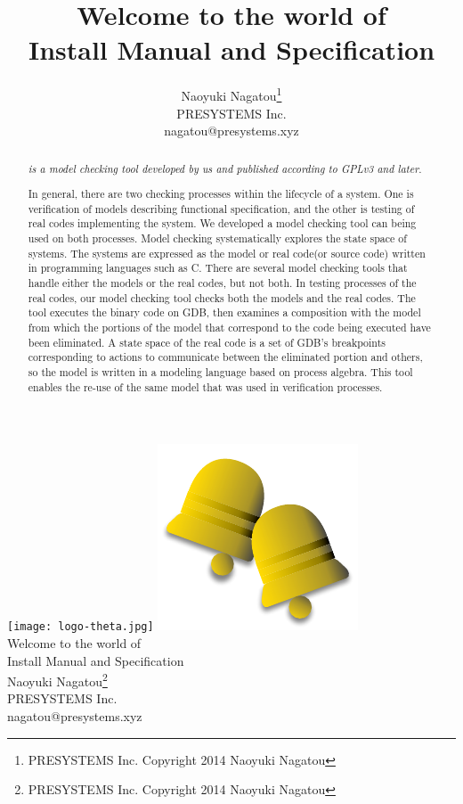 \documentclass[12pt,a4paper,titlepage]{article}
\title{Welcome to the world of \NHK\\
{\small\textemdash Install Manual and Specification\textemdash}}
\author{Naoyuki Nagatou\thanks{PRESYSTEMS Inc. Copyright 2014 Naoyuki Nagatou}\\%
\small PRESYSTEMS Inc.\\[6pt]
\small nagatou@presystems.xyz}
\date{}
\theoremstyle{break}
\begin{document}
  \begin{titlepage}
\vspace*{3cm}
\begin{center}
\texttt{[image: logo-theta.jpg]}
\includegraphics[scale=0.4]{bell.pdf}\\[5cm]
{\LARGE Welcome to the world of \NHK\\
{\small\textemdash Install Manual and Specification\textemdash}}\\[1cm]
{\large Naoyuki Nagatou\thanks{PRESYSTEMS Inc. Copyright 2014 Naoyuki Nagatou}\\%
\small PRESYSTEMS Inc.\\[6pt]
\small nagatou@presystems.xyz}
\end{center}
%
%
\begin{abstract}
\NHK \emph{is a model checking tool developed by us and published according to GPLv3 and later}.

In general, there are two checking processes within the lifecycle of a system.
One is verification of models describing functional specification, 
and the other is testing of real codes implementing the system.
We developed a model checking tool can being used on both processes.
Model checking systematically explores the state space of systems.
The systems are expressed as the model
or real code(or source code) written in programming languages such as C.
There are several model checking tools 
that handle either the models or the real codes,
but not both.
In testing processes of the real codes,
our model checking tool checks both the models and the real codes.
The tool executes the binary code on GDB,
then examines a composition with the model from which the portions of 
the model that correspond to the code being executed
have been eliminated.
A state space of the real code is a set of GDB's breakpoints corresponding to
actions to communicate between the eliminated portion and others,
so the model is written in a modeling language based on process algebra.
This tool enables the re-use of the same model that was used in verification processes.
\end{abstract}
  \end{titlepage}
\tableofcontents
\newpage
\end{document}
